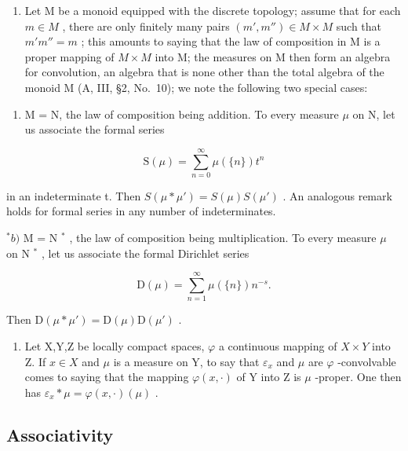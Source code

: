 \begin{enumerate}
\def\labelenumi{\arabic{enumi})}
\setcounter{enumi}{1}
\tightlist
\item
  Let M be a monoid equipped with the discrete topology; assume that for each \(m \in M\) , there are only finitely many pairs \((m', m'') \in M \times M\) such that \(m'm'' = m\) ; this amounts to saying that the law of composition in M is a proper mapping of \(M \times M\) into M; the measures on M then form an algebra for convolution, an algebra that is none other than the total algebra of the monoid M (A, III, §2, No.~10); we note the following two special cases:
\end{enumerate}

\begin{enumerate}
\def\labelenumi{\alph{enumi})}
\tightlist
\item
  M = N, the law of composition being addition. To every measure \(\mu\) on N, let us associate the formal series
\end{enumerate}

\[
\mathrm{S} (\mu) = \sum_ {n = 0} ^ {\infty} \mu (\{n \}) t ^ {n}
\]

in an indeterminate t. Then \(S(\mu * \mu') = S(\mu)S(\mu')\) . An analogous remark holds for formal series in any number of indeterminates.

\(^{*}b)\) M = N \(^{*}\) , the law of composition being multiplication. To every measure \(\mu\) on N \(^{*}\) , let us associate the formal Dirichlet series

\[
\mathrm{D} (\mu) = \sum_ {n = 1} ^ {\infty} \mu (\{n \}) n ^ {- s}.
\]

Then \(\mathrm{D}(\mu * \mu') = \mathrm{D}(\mu) \mathrm{D}(\mu')\) .

\begin{enumerate}
\def\labelenumi{\arabic{enumi})}
\setcounter{enumi}{2}
\tightlist
\item
  Let X,Y,Z be locally compact spaces, \(\varphi\) a continuous mapping of \(X \times Y\) into Z. If \(x \in X\) and \(\mu\) is a measure on Y, to say that \(\varepsilon_{x}\) and \(\mu\) are \(\varphi\) -convolvable comes to saying that the mapping \(\varphi(x,\cdot)\) of Y into Z is \(\mu\) -proper. One then has \(\varepsilon_{x} * \mu = \varphi(x,\cdot)(\mu)\) .
\end{enumerate}

\subsection{Associativity}

